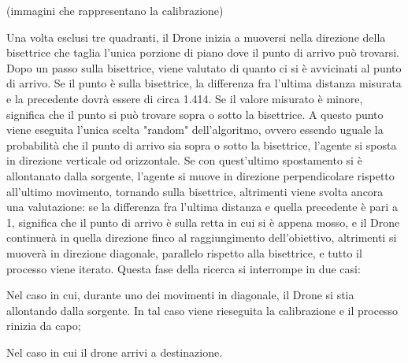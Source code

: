 (immagini che rappresentano la calibrazione)

Una volta esclusi tre quadranti, il Drone inizia a muoversi nella direzione della bisettrice che taglia l'unica porzione di piano dove il punto di arrivo può trovarsi. Dopo un passo sulla bisettrice, viene valutato di quanto ci si è avvicinati al punto di arrivo. Se il punto è sulla bisettrice, la differenza fra l'ultima distanza misurata e la precedente dovrà essere di circa 1.414. Se il valore misurato è minore, significa che il punto si può trovare sopra o sotto la bisettrice. A questo punto viene eseguita l'unica scelta "random" dell'algoritmo, ovvero essendo uguale la probabilità che il punto di arrivo sia sopra o sotto la bisettrice, l'agente si sposta in direzione verticale od orizzontale. Se con quest'ultimo spostamento si è allontanato dalla sorgente, l'agente si muove in direzione perpendicolare rispetto all'ultimo movimento, tornando sulla bisettrice, altrimenti viene svolta ancora una valutazione: se la differenza fra l'ultima distanza e quella precedente è pari a 1, significa che il punto di arrivo è sulla retta in cui si è appena mosso, e il Drone continuerà in quella direzione finco al raggiungimento dell'obiettivo, altrimenti si muoverà in direzione diagonale, parallelo rispetto alla bisettrice, e tutto il processo viene iterato. Questa fase della ricerca si interrompe in due casi: 

Nel caso in cui, durante uno dei movimenti in diagonale, il Drone si stia allontando dalla sorgente. In tal caso viene rieseguita la calibrazione e il processo rinizia da capo;

Nel caso in cui il drone arrivi a destinazione.
